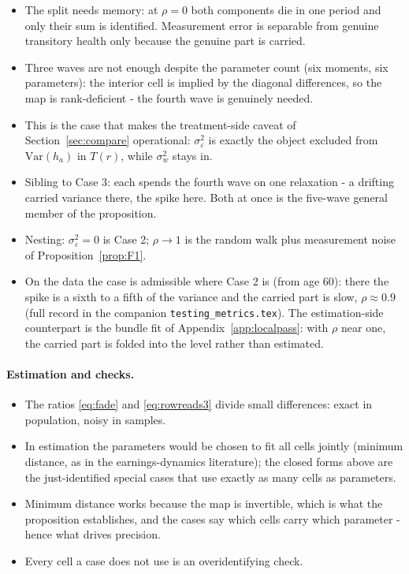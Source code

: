 \documentclass[11pt]{article}
\theoremstyle{remark}
\newcommand{\Var}{\mathrm{Var}}
\begin{document}
\begin{itemize}
\item The split needs memory: at $\rho=0$ both components die in one period and only their sum is identified.
Measurement error is separable from genuine transitory health only because the genuine part is carried.
\item Three waves are not enough despite the parameter count (six moments, six parameters): the interior cell is implied by the diagonal differences, so the map is rank-deficient - the fourth wave is genuinely needed.
\item This is the case that makes the treatment-side caveat of Section~\ref{sec:compare} operational: $\sigma^2_\varepsilon$ is exactly the object excluded from $\Var(h_a)$ in $T(r)$, while $\sigma^2_w$ stays in.
\item Sibling to Case 3: each spends the fourth wave on one relaxation - a drifting carried variance there, the spike here.
Both at once is the five-wave general member of the proposition.
\item Nesting: $\sigma^2_\varepsilon=0$ is Case 2; $\rho\to1$ is the random walk plus measurement noise of Proposition~\ref{prop:F1}.
\item On the data the case is admissible where Case 2 is (from age 60): there the spike is a sixth to a fifth of the variance and the carried part is slow, $\rho\approx0.9$ (full record in the companion \texttt{testing\_metrics.tex}).
The estimation-side counterpart is the bundle fit of Appendix~\ref{app:localpass}: with $\rho$ near one, the carried part is folded into the level rather than estimated.
\end{itemize}

\paragraph{Estimation and checks.}
\begin{itemize}
\item The ratios \eqref{eq:fade} and \eqref{eq:rowreads3} divide small differences: exact in population, noisy in samples.
\item In estimation the parameters would be chosen to fit all cells jointly (minimum distance, as in the earnings-dynamics literature); the closed forms above are the just-identified special cases that use exactly as many cells as parameters.
\item Minimum distance works because the map is invertible, which is what the proposition establishes, and the cases say which cells carry which parameter - hence what drives precision.
\item Every cell a case does not use is an overidentifying check.
\end{itemize}
\end{document}
